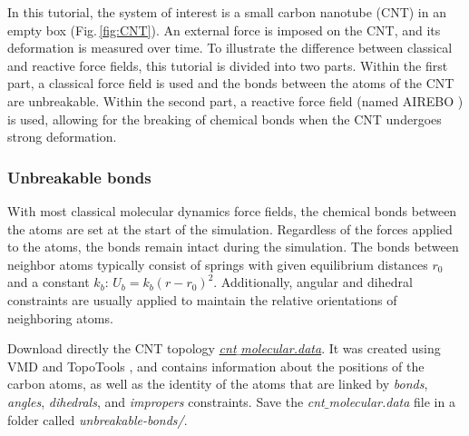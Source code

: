 \documentclass[9pt,tutorial]{livecoms}
\begin{document}
\noindent In this tutorial, the system of interest is a small carbon nanotube (CNT) in an empty box (Fig.\,\ref{fig:CNT}). An external force is imposed on the CNT, and its deformation is measured over time. To illustrate the difference between classical and reactive force fields, this tutorial is divided into two parts. Within the first part, a classical force field is used and the bonds between the atoms of the CNT are unbreakable. Within the second part, a reactive force field (named AIREBO \cite{stuart2000reactive}) is used, allowing for the breaking of chemical bonds when the CNT undergoes strong deformation.

\subsubsection{Unbreakable bonds}
\noindent With most classical molecular dynamics force fields, the chemical bonds between the atoms are set at the start of the simulation. Regardless of the forces applied to the atoms, the bonds remain intact during the simulation. The bonds between neighbor atoms typically consist of springs with given equilibrium distances $r_0$ and a constant $k_b$: $U_b = k_b \left( r - r_0 \right)^2$. Additionally, angular and dihedral constraints are usually applied to maintain the relative orientations of neighboring atoms. 

Download directly the CNT topology \href{https://raw.githubusercontent.com/lammpstutorials/lammpstutorials-article/main/files/tutorial2/cnt_molecular.data}{\textit{cnt$\_$molecular.data}}. It was created using VMD and TopoTools \cite{kohlmeyer2017topotools}, and contains information about the positions of the carbon atoms, as well as the identity of the atoms that are linked by \textit{bonds}, \textit{angles}, \textit{dihedrals}, and \textit{impropers} constraints. Save the \textit{cnt$\_$molecular.data} file
in a folder called \textit{unbreakable-bonds/}.
\end{document}

